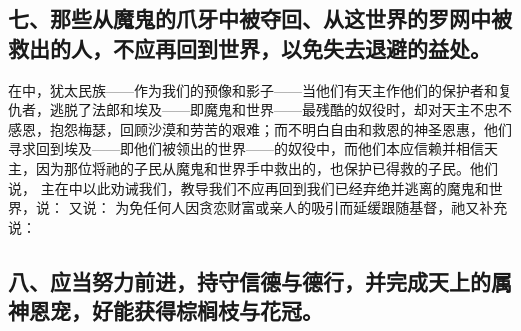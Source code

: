
\subsection{七、那些从魔鬼的爪牙中被夺回、从这世界的罗网中被救出的人，不应再回到世界，以免失去退避的益处。}

在中，犹太民族——作为我们的预像和影子——当他们有天主作他们的保护者和复仇者，逃脱了法郎和埃及——即魔鬼和世界——最残酷的奴役时，却对天主不忠不感恩，抱怨梅瑟，回顾沙漠和劳苦的艰难；而不明白自由和救恩的神圣恩惠，他们寻求回到埃及——即他们被领出的世界——的奴役中，而他们本应信赖并相信天主，因为那位将祂的子民从魔鬼和世界手中救出的，也保护已得救的子民。他们说，  主在中以此劝诫我们，教导我们不应再回到我们已经弃绝并逃离的魔鬼和世界，说：  又说： 为免任何人因贪恋财富或亲人的吸引而延缓跟随基督，祂又补充说： \par


\subsection{八、应当努力前进，持守信德与德行，并完成天上的属神恩宠，好能获得棕榈枝与花冠。}

